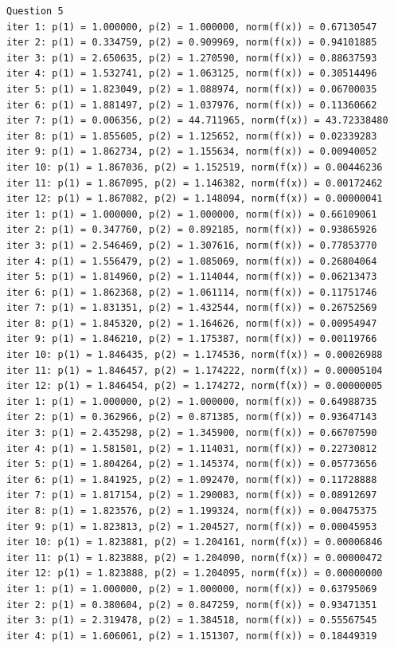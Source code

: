 \documentclass[12pt]{article}
\begin{document}
\begin{tiny}
\begin{verbatim}
Question 5
iter 1: p(1) = 1.000000, p(2) = 1.000000, norm(f(x)) = 0.67130547
iter 2: p(1) = 0.334759, p(2) = 0.909969, norm(f(x)) = 0.94101885
iter 3: p(1) = 2.650635, p(2) = 1.270590, norm(f(x)) = 0.88637593
iter 4: p(1) = 1.532741, p(2) = 1.063125, norm(f(x)) = 0.30514496
iter 5: p(1) = 1.823049, p(2) = 1.088974, norm(f(x)) = 0.06700035
iter 6: p(1) = 1.881497, p(2) = 1.037976, norm(f(x)) = 0.11360662
iter 7: p(1) = 0.006356, p(2) = 44.711965, norm(f(x)) = 43.72338480
iter 8: p(1) = 1.855605, p(2) = 1.125652, norm(f(x)) = 0.02339283
iter 9: p(1) = 1.862734, p(2) = 1.155634, norm(f(x)) = 0.00940052
iter 10: p(1) = 1.867036, p(2) = 1.152519, norm(f(x)) = 0.00446236
iter 11: p(1) = 1.867095, p(2) = 1.146382, norm(f(x)) = 0.00172462
iter 12: p(1) = 1.867082, p(2) = 1.148094, norm(f(x)) = 0.00000041
iter 1: p(1) = 1.000000, p(2) = 1.000000, norm(f(x)) = 0.66109061
iter 2: p(1) = 0.347760, p(2) = 0.892185, norm(f(x)) = 0.93865926
iter 3: p(1) = 2.546469, p(2) = 1.307616, norm(f(x)) = 0.77853770
iter 4: p(1) = 1.556479, p(2) = 1.085069, norm(f(x)) = 0.26804064
iter 5: p(1) = 1.814960, p(2) = 1.114044, norm(f(x)) = 0.06213473
iter 6: p(1) = 1.862368, p(2) = 1.061114, norm(f(x)) = 0.11751746
iter 7: p(1) = 1.831351, p(2) = 1.432544, norm(f(x)) = 0.26752569
iter 8: p(1) = 1.845320, p(2) = 1.164626, norm(f(x)) = 0.00954947
iter 9: p(1) = 1.846210, p(2) = 1.175387, norm(f(x)) = 0.00119766
iter 10: p(1) = 1.846435, p(2) = 1.174536, norm(f(x)) = 0.00026988
iter 11: p(1) = 1.846457, p(2) = 1.174222, norm(f(x)) = 0.00005104
iter 12: p(1) = 1.846454, p(2) = 1.174272, norm(f(x)) = 0.00000005
iter 1: p(1) = 1.000000, p(2) = 1.000000, norm(f(x)) = 0.64988735
iter 2: p(1) = 0.362966, p(2) = 0.871385, norm(f(x)) = 0.93647143
iter 3: p(1) = 2.435298, p(2) = 1.345900, norm(f(x)) = 0.66707590
iter 4: p(1) = 1.581501, p(2) = 1.114031, norm(f(x)) = 0.22730812
iter 5: p(1) = 1.804264, p(2) = 1.145374, norm(f(x)) = 0.05773656
iter 6: p(1) = 1.841925, p(2) = 1.092470, norm(f(x)) = 0.11728888
iter 7: p(1) = 1.817154, p(2) = 1.290083, norm(f(x)) = 0.08912697
iter 8: p(1) = 1.823576, p(2) = 1.199324, norm(f(x)) = 0.00475375
iter 9: p(1) = 1.823813, p(2) = 1.204527, norm(f(x)) = 0.00045953
iter 10: p(1) = 1.823881, p(2) = 1.204161, norm(f(x)) = 0.00006846
iter 11: p(1) = 1.823888, p(2) = 1.204090, norm(f(x)) = 0.00000472
iter 12: p(1) = 1.823888, p(2) = 1.204095, norm(f(x)) = 0.00000000
iter 1: p(1) = 1.000000, p(2) = 1.000000, norm(f(x)) = 0.63795069
iter 2: p(1) = 0.380604, p(2) = 0.847259, norm(f(x)) = 0.93471351
iter 3: p(1) = 2.319478, p(2) = 1.384518, norm(f(x)) = 0.55567545
iter 4: p(1) = 1.606061, p(2) = 1.151307, norm(f(x)) = 0.18449319

\end{verbatim}
\end{tiny}
\end{document}
